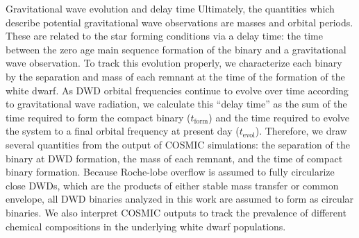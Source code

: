 \documentclass[twocolumn]{aastex631}
\begin{document}
\begin{subsection}{Gravitational wave evolution and delay time}
Ultimately, the quantities which describe potential gravitational wave observations
    are masses and orbital periods.
These are related to the star forming conditions via a delay time:
    the time between the zero age main sequence formation of 
    the binary and a gravitational wave observation.
To track this evolution properly, we characterize each binary by
    the separation and mass of each remnant at the time of
    the formation of the white dwarf.
As DWD orbital frequencies continue to evolve over time
    according to gravitational wave radiation, 
    we calculate this ``delay time'' as the sum of the time required to form the compact binary
    ($t_{\mathrm{form}}$)
    and the time required to evolve the system to a final orbital frequency
    at present day
    ($t_{\mathrm{evol}}$).
Therefore, we draw several quantities from the output of COSMIC simulations:
    the separation of the binary at DWD formation,
    the mass of each remnant,
    and the time of compact binary formation.
Because Roche-lobe overflow 
    is assumed to fully circularize close DWDs, 
    which are the products of either stable mass transfer or common envelope, 
    all DWD binaries analyzed in this work are assumed to form as circular binaries.
We also interpret COSMIC outputs to track the prevalence of different chemical compositions
    in the underlying white dwarf populations.


\end{subsection}
\end{document}
